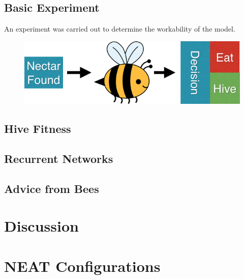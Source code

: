 \documentclass[11pt]{article}
\begin{document}
		\subsection{Basic Experiment} %
		\label{sub:basic_experiment}
			An experiment was carried out to determine the workability of the model. 

			\begin{figure}[tb]
				\begin{center}
					\includegraphics[scale=.5]{bee_diagrams/naive_system.png}
				\end{center}
				\caption{}
				\label{fig:naive_system}
			\end{figure}

		\subsection{Hive Fitness} %
		\label{sub:hive_fitness}
		\lipsum[10-12]

		\subsection{Recurrent Networks} %
		\label{sub:recurrent_networks}
		\lipsum[12-14]

		\subsection{Advice from Bees} %
		\label{sub:advice_from_bees}
		


	\section{Discussion} %
	\label{sec:discussion}
	\lipsum[14-20]
	\singlespacing
	\appendix
	\pagebreak
	\section{NEAT Configurations} %
	\label{sec:neat_configurations}
	
\end{document}
